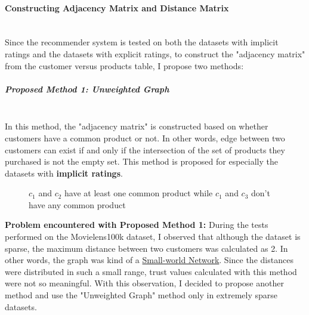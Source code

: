 \paragraph{Constructing Adjacency Matrix and Distance Matrix}\mbox{}\\
Since the recommender system is tested on both the datasets with implicit ratings and the datasets with explicit ratings, to construct the "adjacency matrix" from the customer versus products table, I propose two methods: 
\subparagraph{Proposed Method 1: Unweighted Graph}\mbox{}\\
\label{prop_method_1}
In this method, the "adjacency matrix" is constructed based on whether customers have a common product or not. In other words, edge between two customers can exist if and only if the intersection of the set of products they purchased is not the empty set. This method is proposed for especially the datasets with \textbf{implicit ratings}.
\begin{figure}[H]
	\centering
	\caption{$c_{1}$ and $c_{2}$ have at least one common product while $c_{1}$ and $c_{3}$ don't have any common product}
\end{figure}

\textbf{Problem encountered with Proposed Method 1:} During the tests performed on the Movielens100k dataset, I observed that although the dataset is sparse, the maximum distance between two customers was calculated as 2. In other words, the graph was kind of a \href{https://en.wikipedia.org/wiki/Small-world_network}{Small-world Network}. Since the distances were distributed in such a small range, trust values calculated with this method were not so meaningful. With this observation, I decided to propose another method and use the "Unweighted Graph" method only in extremely sparse datasets.

